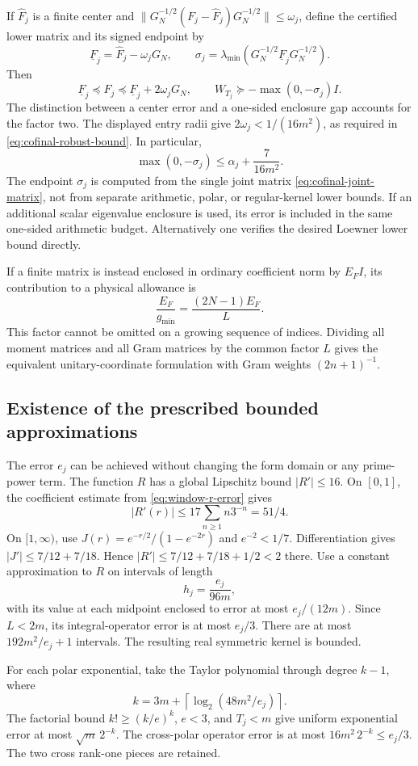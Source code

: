 If $\widehat F_j$ is a finite center and
$\|G_N^{-1/2}(F_j-\widehat F_j)G_N^{-1/2}\|\le\omega_j$,
define the certified lower matrix and its signed endpoint by
\[
 \underline F_j=\widehat F_j-\omega_jG_N,\qquad
 \sigma_j=\lambda_{\min}
 (G_N^{-1/2}\underline F_jG_N^{-1/2}).
\]
Then
\[
 \underline F_j\preceq F_j\preceq
 \underline F_j+2\omega_jG_N,\qquad
 W_{T_j}\succeq-\max(0,-\sigma_j)I.
\]
The distinction between a center error and a one-sided enclosure
gap accounts for the factor two. The displayed entry radii give
$2\omega_j<1/(16m^2)$, as required in
\eqref{eq:cofinal-robust-bound}. In particular,
\[
 \max(0,-\sigma_j)\le\alpha_j+\frac7{16m^2}.
\]
The endpoint $\sigma_j$ is computed from the single joint matrix
\eqref{eq:cofinal-joint-matrix}, not from separate arithmetic,
polar, or regular-kernel lower bounds.
If an additional scalar eigenvalue enclosure is used, its error
is included in the same one-sided arithmetic budget. Alternatively
one verifies the desired Loewner lower bound directly.

If a finite matrix is instead enclosed in ordinary coefficient
norm by $E_FI$, its contribution to a physical allowance is
\[
 \frac{E_F}{g_{\min}}=\frac{(2N-1)E_F}{L}.
\]
This factor cannot be omitted on a growing sequence of indices.
Dividing all moment matrices and all Gram matrices by the common
factor $L$ gives the equivalent unitary-coordinate formulation
with Gram weights $(2n+1)^{-1}$.

\subsection{Existence of the prescribed bounded approximations}

The error $e_j$ can be achieved without changing the form domain
or any prime-power term. The function $R$ has a global Lipschitz
bound $|R'|\le16$. On $[0,1]$, the coefficient estimate from
\eqref{eq:window-r-error} gives
\[
 |R'(r)|\le17\sum_{n\ge1}n3^{-n}=51/4.
\]
On $[1,\infty)$, use
$J(r)=e^{-r/2}/(1-e^{-2r})$ and $e^{-2}<1/7$.  Differentiation
gives $|J'|\le7/12+7/18$.  Hence
$|R'|\le7/12+7/18+1/2<2$ there.
Use a constant approximation to $R$ on intervals of length
\[
 h_j=\frac{e_j}{96m},
\]
with its value at each midpoint enclosed to error at most
$e_j/(12m)$. Since $L<2m$, its integral-operator error is at
most $e_j/3$. There are at most $192m^2/e_j+1$ intervals.
The resulting real symmetric kernel is bounded.

For each polar exponential, take the Taylor polynomial through
degree $k-1$, where
\[
 k=3m+\left\lceil\log_2(48m^2/e_j)\right\rceil.
\]
The factorial bound $k!\ge(k/e)^k$, $e<3$, and $T_j<m$ give
uniform exponential error at most $\sqrt m\,2^{-k}$.
The cross-polar operator error is at most
$16m^2\,2^{-k}\le e_j/3$. The two cross rank-one pieces are
retained.

